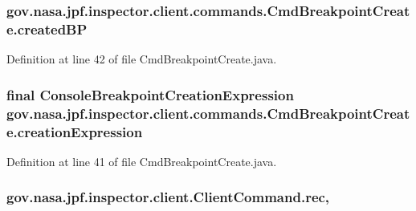 \subsubsection[{\texorpdfstring{created\+BP}{createdBP}}]{ gov.\+nasa.\+jpf.\+inspector.\+client.\+commands.\+Cmd\+Breakpoint\+Create.\+created\+BP\hspace{0.3cm}{\ttfamily [private]}}\hypertarget{classgov_1_1nasa_1_1jpf_1_1inspector_1_1client_1_1commands_1_1_cmd_breakpoint_create_aad3388a2fbaf06146baf0194cbb77cdf}{}\label{classgov_1_1nasa_1_1jpf_1_1inspector_1_1client_1_1commands_1_1_cmd_breakpoint_create_aad3388a2fbaf06146baf0194cbb77cdf}


Definition at line 42 of file Cmd\+Breakpoint\+Create.\+java.

\subsubsection[{\texorpdfstring{creation\+Expression}{creationExpression}}]{\setlength{\rightskip}{0pt plus 5cm}final {\bf Console\+Breakpoint\+Creation\+Expression} gov.\+nasa.\+jpf.\+inspector.\+client.\+commands.\+Cmd\+Breakpoint\+Create.\+creation\+Expression\hspace{0.3cm}{\ttfamily [private]}}\hypertarget{classgov_1_1nasa_1_1jpf_1_1inspector_1_1client_1_1commands_1_1_cmd_breakpoint_create_a5b4a48a9d6bb14f38d3abdccd3b0acb1}{}\label{classgov_1_1nasa_1_1jpf_1_1inspector_1_1client_1_1commands_1_1_cmd_breakpoint_create_a5b4a48a9d6bb14f38d3abdccd3b0acb1}


Definition at line 41 of file Cmd\+Breakpoint\+Create.\+java.

\subsubsection[{\texorpdfstring{rec}{rec}}]{ gov.\+nasa.\+jpf.\+inspector.\+client.\+Client\+Command.\+rec\hspace{0.3cm}{\ttfamily [protected]}, {\ttfamily [inherited]}}\hypertarget{classgov_1_1nasa_1_1jpf_1_1inspector_1_1client_1_1_client_command_af4246f2427035c72a6af45a2c61361f7}{}\label{classgov_1_1nasa_1_1jpf_1_1inspector_1_1client_1_1_client_command_af4246f2427035c72a6af45a2c61361f7}


